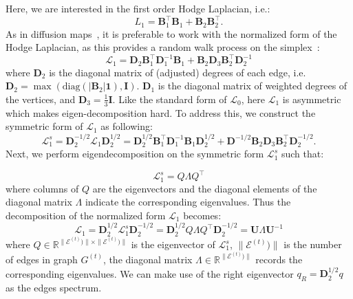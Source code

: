 Here, we are interested in the first order Hodge Laplacian, i.e.:
\begin{equation}
\label{eqn:hodgeLaplacian2}
{L}_1 = \mathbf{B}_{1}^\top \mathbf{B}_{1} + \mathbf{B}_{2} \mathbf{B}_{2}^\top.
\end{equation}
As in diffusion maps~\citep{witten1981diffusion}, it is preferable to work with the normalized form of the Hodge Laplacian, as this provides a random walk process on the simplex~\citep{Schaub2020}:
\begin{equation}
\label{eqn:normL1}
\mathcal{L}_1 = \mathbf{D}_2 \mathbf{B}_1^\top \mathbf{D}_1^{-1} \mathbf{B}_1 + \mathbf{B}_2 \mathbf{D}_3 \mathbf{B}_2^\top \mathbf{D}_2^{-1}
\end{equation}
\noindent where $\mathbf{D}_2$ is the diagonal matrix of (adjusted) degrees of each edge, i.e. $\mathbf{D}_2 = \max{(\text{diag}(|\mathbf{B}_2| \mathbf{1}), \mathbf{I})}$. $\mathbf{D}_1$ is the diagonal matrix of weighted degrees of the vertices, and $\mathbf{D}_3=\frac{1}{3}\mathbf{I}$. Like the standard form of $\mathcal{L}_0$, here $\mathcal{L}_1$ is asymmetric which makes eigen-decomposition hard. To address this, we construct the symmetric form of $\mathcal{L}_1$ as following:
\begin{equation}
\label{eqn:normL1sym}
\mathcal{L}_1^s = \mathbf{D}_2^{-1/2} \mathcal{L}_1 \mathbf{D}_2^{1/2} = \mathbf{D}_2^{1/2} \mathbf{B}_1^\top \mathbf{D}_1^{-1} \mathbf{B}_1 \mathbf{D}_2^{1/2} + \mathbf{D}^{-1/2} \mathbf{B}_2 \mathbf{D}_3 \mathbf{B}_2^\top \mathbf{D}_2^{-1/2}.
\end{equation}
\noindent Next, we perform eigendecomposition on the symmetric form $\mathcal{L}_1^s$ such that:

\begin{equation}
\label{eqn:l1symeigendecomposition}
\mathcal{L}_1^s = Q\Lambda Q^\top
\end{equation}
\noindent where columns of $Q$ are the eigenvectors and the diagonal elements of the diagonal matrix $\Lambda$ indicate the corresponding eigenvalues. Thus the decomposition of the normalized form $\mathcal{L}_1$ becomes:
\begin{equation}
\label{eqn:l1decomposition}
\mathcal{L}_1 = \mathbf{D}_2^{1/2} \mathcal{L}_1^s \mathbf{D}_2^{-1/2} =  \mathbf{D}_2^{1/2} Q \Lambda Q^\top \mathbf{D}_2^{-1/2} = \mathbf{U} \Lambda \mathbf{U}^{-1}
\end{equation}
\noindent where $Q\in \mathbb{R}^{\|\mathcal{E}^{(t)})\|\times \|\mathcal{E}^{(t)})\|}$ is the eigenvector of $\mathcal{L}_1^s$, $\|\mathcal{E}^{(t)})\|$ is the number of edges in graph $G^{(t)}$, the diagonal matrix $\Lambda\in \mathbb{R}^{\|\mathcal{E}^{(t)})\|}$ records the corresponding eigenvalues. We can make use of the right eigenvector $q_R = \mathbf{D}_2^{1/2} q$ as the edges spectrum.

